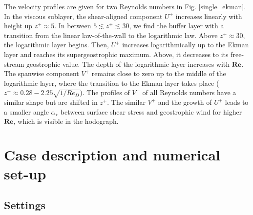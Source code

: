 \documentclass[smallcondensed,draft]{svjour3} %
\newcommand{\RE}{\mathbf{Re}}
\begin{document}
The velocity profiles are given for two Reynolds numbers in Fig. \ref{single_ekman}. 
In the viscous sublayer, the shear-aligned component $U^+$ increases linearly with height up 
$z^+\approx5$. In between $5 \lesssim z^+ \lesssim 30$, we find the buffer layer with a transition from the linear law-of-the-wall to the logarithmic law. Above $z^+\approx30$, the logarithmic layer begins. Then, $U^+$ increases logarithmically up to the Ekman layer and reaches its supergeostrophic maximum. Above, it decreases to its free-stream geostrophic value. The depth of the logarithmic layer increases with $\RE$. The spanwise component $V^+$ remains close to zero up to the middle of the logarithmic layer, where the transition to the Ekman layer takes place ($z^-\approx0.28-2.25\sqrt{1/Re_D}$). The profiles of $V^+$ of all Reynolds numbers have a similar shape but are shifted in $z^+$. The similar $V^+$ and the growth of $U^+$ leads to a smaller angle $\alpha_\star$ between surface shear stress and geostrophic wind for higher $\RE$, which is visible in the hodograph.

\section{Case description and numerical set-up}
\label{setup}

\subsection{Settings}
\end{document}
